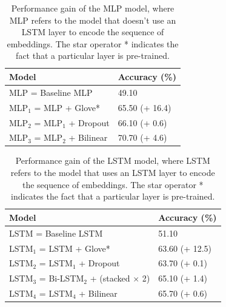\documentclass[11pt,a4paper]{article}
\begin{document}
	\begin{table}[H]
		\centering
		\begin{tabular}{@{}ll@{}}
			\toprule
			\textbf{Model}               & \textbf{Accuracy (\%)} \\ \midrule
			MLP = Baseline MLP           & 49.10              \\
			MLP$_1$ = MLP + Glove*       & 65.50 (+ 16.4)     \\
			MLP$_2$ = MLP$_1$ + Dropout  & 66.10 (+ 0.6)      \\
			MLP$_3$ = MLP$_2$ + Bilinear & 70.70 (+ 4.6)     \\ \bottomrule
		\end{tabular}
		\caption{Performance gain of the MLP model, where MLP refers to the model that doesn't use an LSTM layer to encode the sequence of embeddings. The star operator * indicates the fact that a particular layer is pre-trained.}
		\label{tab:MLP-model}
	\end{table}
	
	\begin{table}[H]
		\centering
		\begin{tabular}{@{}ll@{}}
			\toprule
			\textbf{Model}                                        & \textbf{Accuracy (\%)} \\ \midrule
			LSTM = Baseline LSTM                                  & 51.10                  \\
			LSTM$_1$ = LSTM + Glove*                              & 63.60 (+ 12.5)         \\
			LSTM$_2$ = LSTM$_1$ + Dropout                         & 63.70 (+ 0.1)          \\
			LSTM$_3$ = Bi-LSTM$_2$ + (stacked $\times$ 2) & 65.10 (+ 1.4)          \\
			LSTM$_4$ = LSTM$_4$ + Bilinear                        & 65.70 (+ 0.6)       \\ \bottomrule  
		\end{tabular}
		\caption{Performance gain of the LSTM model, where LSTM refers to the model that uses an LSTM layer to encode the sequence of embeddings. The star operator * indicates the fact that a particular layer is pre-trained.}
		\label{tab:LSTM-model}
	\end{table}
\end{document}
